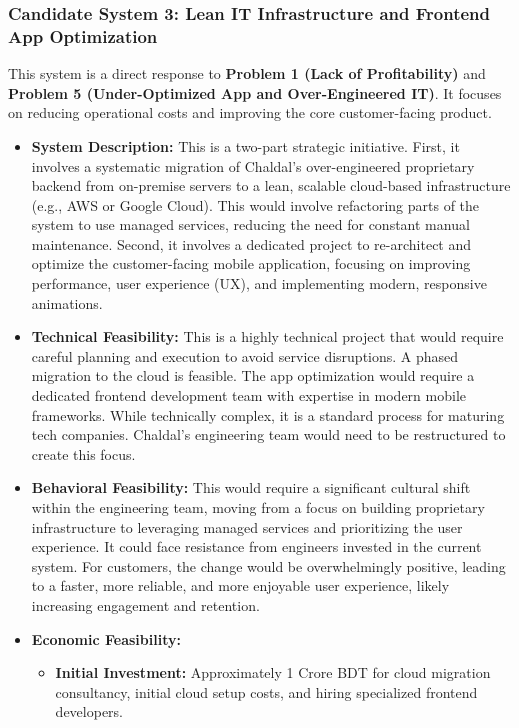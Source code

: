 \documentclass[12pt,a4paper]{article}
\begin{document}
\subsubsection{Candidate System 3: Lean IT Infrastructure and Frontend App Optimization}

This system is a direct response to \textbf{Problem 1 (Lack of Profitability)} and \textbf{Problem 5 (Under-Optimized App and Over-Engineered IT)}. It focuses on reducing operational costs and improving the core customer-facing product.

\begin{itemize}
    \item \textbf{System Description:} This is a two-part strategic initiative. First, it involves a systematic migration of Chaldal's over-engineered proprietary backend from on-premise servers to a lean, scalable cloud-based infrastructure (e.g., AWS or Google Cloud). This would involve refactoring parts of the system to use managed services, reducing the need for constant manual maintenance. Second, it involves a dedicated project to re-architect and optimize the customer-facing mobile application, focusing on improving performance, user experience (UX), and implementing modern, responsive animations.
    \item \textbf{Technical Feasibility:} This is a highly technical project that would require careful planning and execution to avoid service disruptions. A phased migration to the cloud is feasible. The app optimization would require a dedicated frontend development team with expertise in modern mobile frameworks. While technically complex, it is a standard process for maturing tech companies. Chaldal's engineering team would need to be restructured to create this focus.
    \item \textbf{Behavioral Feasibility:} This would require a significant cultural shift within the engineering team, moving from a focus on building proprietary infrastructure to leveraging managed services and prioritizing the user experience. It could face resistance from engineers invested in the current system. For customers, the change would be overwhelmingly positive, leading to a faster, more reliable, and more enjoyable user experience, likely increasing engagement and retention.
    \item \textbf{Economic Feasibility:} 
    \begin{itemize}
        \item \textbf{Initial Investment:} Approximately 1 Crore BDT for cloud migration consultancy, initial cloud setup costs, and hiring specialized frontend developers.

\end{itemize}
\end{itemize}
\end{document}
